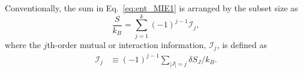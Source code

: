 \documentclass[reprint, superscriptaddress]{revtex4-1}
\newcommand{\note}[1]{{\color{DarkGreen}\footnotesize \textsc{Note.} #1}}
\newcommand{\MI}{\mathcal I} %
\begin{document}
Conventionally, the sum in Eq.~\eqref{eq:ent_MIE1}
is arranged by the subset size as
\begin{equation}
  \frac{S}{k_B}
  =
  \sum_{j = 1}^k (-1)^{j-1} \MI_j
  ,
  \label{eq:S_MIE}
\end{equation}
%
where the $j$th-order mutual or interaction information, $\MI_j$, is defined as
\begin{align}
  \MI_j
  &\equiv (-1)^{j-1} \sum_{|J| = j}
  \delta S_J / k_B
  .
  \label{eq:MI_comb}
\end{align}
%

%
\end{document}
